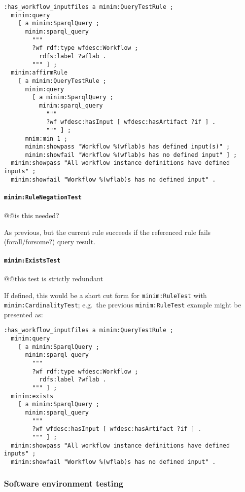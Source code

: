 \documentclass[]{article}
\begin{document}
\begin{verbatim}
:has_workflow_inputfiles a minim:QueryTestRule ;
  minim:query 
    [ a minim:SparqlQuery ; 
      minim:sparql_query 
        """
        ?wf rdf:type wfdesc:Workflow ;
          rdfs:label ?wflab .
        """ ] ;
  minim:affirmRule
    [ a minim:QueryTestRule ;
      minim:query
        [ a minim:SparqlQuery ; 
          minim:sparql_query 
            """
            ?wf wfdesc:hasInput [ wfdesc:hasArtifact ?if ] .
            """ ] ;
      mnim:min 1 ;
      minim:showpass "Workflow %(wflab)s has defined input(s)" ;
      minim:showfail "Workflow %(wflab)s has no defined input" ] ;
  minim:showpass "All workflow instance definitions have defined inputs" ;
  minim:showfail "Workflow %(wflab)s has no defined input" .
\end{verbatim}

\paragraph{\texttt{minim:RuleNegationTest}}

@@is this needed?

As previous, but the current rule succeeds if the referenced rule fails
(forall/forsome?) query result.

\paragraph{\texttt{minim:ExistsTest}}

@@this test is strictly redundant

If defined, this would be a short cut form for \texttt{minim:RuleTest}
with \texttt{minim:CardinalityTest}; e.g.~the previous
\texttt{minim:RuleTest} example might be presented as:

\begin{verbatim}
:has_workflow_inputfiles a minim:QueryTestRule ;
  minim:query 
    [ a minim:SparqlQuery ; 
      minim:sparql_query 
        """
        ?wf rdf:type wfdesc:Workflow ;
          rdfs:label ?wflab .
        """ ] ;
  minim:exists
    [ a minim:SparqlQuery ; 
      minim:sparql_query 
        """
        ?wf wfdesc:hasInput [ wfdesc:hasArtifact ?if ] .
        """ ] ;
  minim:showpass "All workflow instance definitions have defined inputs" ;
  minim:showfail "Workflow %(wflab)s has no defined input" .
\end{verbatim}

\subsubsection{Software environment testing}
\end{document}
